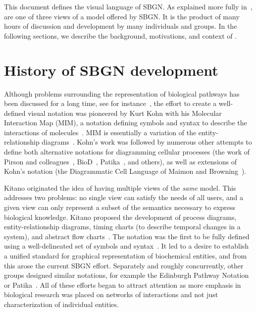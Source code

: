 This document defines the \emph{\ER{}} visual language of SBGN.  As explained more fully in~, \ERs are one of three views of a model offered by SBGN.  It is the product of many hours of discussion and development by many individuals and groups.  In the following sections, we describe the background, motivations, and context of \ERs.


\section{History of SBGN development}
\label{sec:history}

Although problems surrounding the representation of biological pathways has been discussed for a long time, see for instance~\cite{Michal:1998}, the effort to create a well-defined visual notation was pioneered by Kurt Kohn with his Molecular Interaction Map (MIM), a notation defining symbols and syntax to describe the interactions of molecules~\cite{Kohn:1999}.  MIM is essentially a variation of the entity-relationship diagrams~\cite{Chen:1976}. Kohn's work was followed by numerous other attempts to define both alternative notations for diagramming cellular processes (\eg the work of Pirson and colleagues~\cite{Pirson:2000}, BioD~\cite{Cook:2001}, Patika~\cite{Demir:2002,Demir:2004}, and others), as well as extensions of Kohn's notation (\eg the Diagrammatic Cell Language of Maimon and Browning~\cite{Maimon:2001}).

Kitano originated the idea of having multiple views of the \emph{same} model.  This addresses two problems: no single view can satisfy the needs of all users, and a given view can only represent a subset of the semantics necessary to express biological knowledge.  Kitano proposed the development of process diagrams, entity-relationship diagrams, timing charts (to describe temporal changes in a system), and abstract flow charts~\cite{Kitano:2003}.  The \PD notation was the first to be fully defined using a well-delineated set of symbols and syntax~\cite{Kitano:2005}.  It led to a desire to establish a unified standard for graphical representation of biochemical entities, and from this arose the current SBGN effort.  Separately and roughly concurrently, other groups designed similar notations, for example the Edinburgh Pathway Notation~\cite{Moodie:2006} or Patika~\cite{Demir:2002,Demir:2004}.  All of these efforts began to attract attention as more emphasis in biological research was placed on networks of interactions and not just characterization of individual entities.

